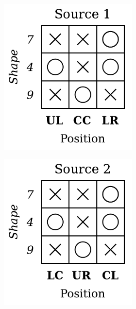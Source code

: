 \begin{dataset}
\begin{figure}[H]
\begin{subfigure}[b]{0.45\textwidth}
\begin{subfigure}[b]{0.48\textwidth}
                \includegraphics[width=\textwidth]{img/datasets/2-CGO_fact=pos_env=0.pdf}
            \end{subfigure}
            \begin{subfigure}[b]{0.48\textwidth}
                \centering
                \includegraphics[width=\textwidth]{img/datasets/2-CGO_fact=pos_env=1.pdf}

\end{subfigure}
\end{subfigure}
\end{figure}
\end{dataset}
